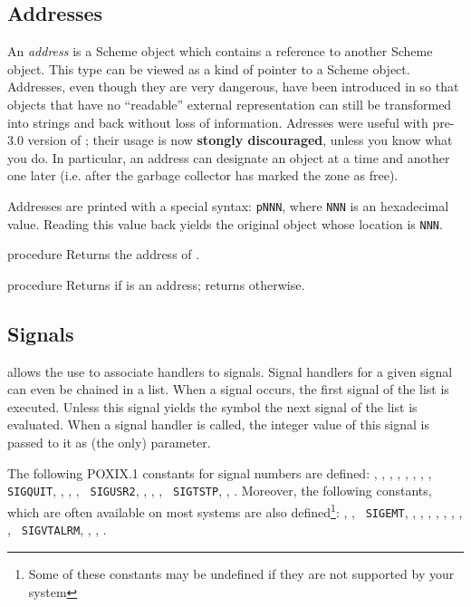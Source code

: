 \subsection{Addresses}

\label{addresses}
An {\em address} is a Scheme object which contains a reference to
another Scheme object. This type can be viewed as a kind of pointer to
a Scheme object.  Addresses, even though they are very dangerous, have
been introduced in {\stk} so that objects that have no ``readable''
external representation can still be transformed into strings and back
without loss of information. Adresses were useful with pre-3.0 version
of {\stk}; their usage is now {\bf stongly discouraged}, unless you know what you
do. In particular, an address can designate an object at a time and
another one later (i.e. after the garbage collector has marked the zone
as free).

Addresses are printed with a special syntax: {\tt {\sharpsign}pNNN},
where {\tt NNN} is an hexadecimal value. Reading this value back
yields the original object whose location is {\tt NNN}.

\begin{entry}{%
 {procedure}}
\saut
Returns the address of .
\end{entry}

\begin{entry}{%
 {procedure}}
\saut
Returns {\schtrue} if  is an address; returns {\schfalse} otherwise.
\end{entry}

\subsection{Signals}

\label{signals}
{\stk} allows the use to associate handlers to signals. Signal
handlers for a given signal can even be chained in a list. When a
signal occurs, the first signal of the list is executed. Unless this
signal yields the symbol  the next signal of the list is
evaluated. When a signal handler is called, the integer value of this
signal is passed to it as (the only) parameter.

The following POXIX.1 constants for signal numbers
are defined: , , , ,
, , , , {\tt
  SIGQUIT}, , , , {\tt
  SIGUSR2}, , , , {\tt
  SIGTSTP}, , .  Moreover, the following
constants, which are often available on most systems are also
defined\footnote{Some of these constants may be undefined if they are
  not supported by your system}: , , {\tt
  SIGEMT}, , , , ,
, , , , {\tt
  SIGVTALRM}, , , .

